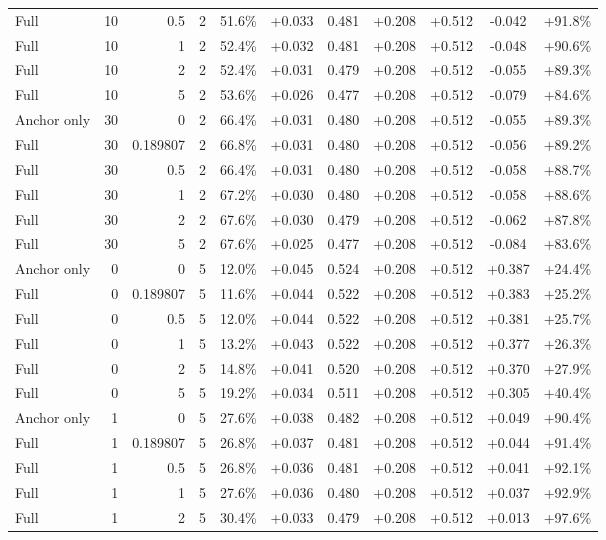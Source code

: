 \begin{table}[htbp]
\begin{tabular}{lrrrccccccc}
Full & 10 & 0.5 & 2 & 51.6\% & +0.033 & 0.481 & +0.208 & +0.512 & -0.042 & +91.8\% \\
Full & 10 & 1 & 2 & 52.4\% & +0.032 & 0.481 & +0.208 & +0.512 & -0.048 & +90.6\% \\
Full & 10 & 2 & 2 & 52.4\% & +0.031 & 0.479 & +0.208 & +0.512 & -0.055 & +89.3\% \\
Full & 10 & 5 & 2 & 53.6\% & +0.026 & 0.477 & +0.208 & +0.512 & -0.079 & +84.6\% \\
Anchor only & 30 & 0 & 2 & 66.4\% & +0.031 & 0.480 & +0.208 & +0.512 & -0.055 & +89.3\% \\
Full & 30 & 0.189807 & 2 & 66.8\% & +0.031 & 0.480 & +0.208 & +0.512 & -0.056 & +89.2\% \\
Full & 30 & 0.5 & 2 & 66.4\% & +0.031 & 0.480 & +0.208 & +0.512 & -0.058 & +88.7\% \\
Full & 30 & 1 & 2 & 67.2\% & +0.030 & 0.480 & +0.208 & +0.512 & -0.058 & +88.6\% \\
Full & 30 & 2 & 2 & 67.6\% & +0.030 & 0.479 & +0.208 & +0.512 & -0.062 & +87.8\% \\
Full & 30 & 5 & 2 & 67.6\% & +0.025 & 0.477 & +0.208 & +0.512 & -0.084 & +83.6\% \\
Anchor only & 0 & 0 & 5 & 12.0\% & +0.045 & 0.524 & +0.208 & +0.512 & +0.387 & +24.4\% \\
Full & 0 & 0.189807 & 5 & 11.6\% & +0.044 & 0.522 & +0.208 & +0.512 & +0.383 & +25.2\% \\
Full & 0 & 0.5 & 5 & 12.0\% & +0.044 & 0.522 & +0.208 & +0.512 & +0.381 & +25.7\% \\
Full & 0 & 1 & 5 & 13.2\% & +0.043 & 0.522 & +0.208 & +0.512 & +0.377 & +26.3\% \\
Full & 0 & 2 & 5 & 14.8\% & +0.041 & 0.520 & +0.208 & +0.512 & +0.370 & +27.9\% \\
Full & 0 & 5 & 5 & 19.2\% & +0.034 & 0.511 & +0.208 & +0.512 & +0.305 & +40.4\% \\
Anchor only & 1 & 0 & 5 & 27.6\% & +0.038 & 0.482 & +0.208 & +0.512 & +0.049 & +90.4\% \\
Full & 1 & 0.189807 & 5 & 26.8\% & +0.037 & 0.481 & +0.208 & +0.512 & +0.044 & +91.4\% \\
Full & 1 & 0.5 & 5 & 26.8\% & +0.036 & 0.481 & +0.208 & +0.512 & +0.041 & +92.1\% \\
Full & 1 & 1 & 5 & 27.6\% & +0.036 & 0.480 & +0.208 & +0.512 & +0.037 & +92.9\% \\
Full & 1 & 2 & 5 & 30.4\% & +0.033 & 0.479 & +0.208 & +0.512 & +0.013 & +97.6\% \\

\end{tabular}
\end{table}
